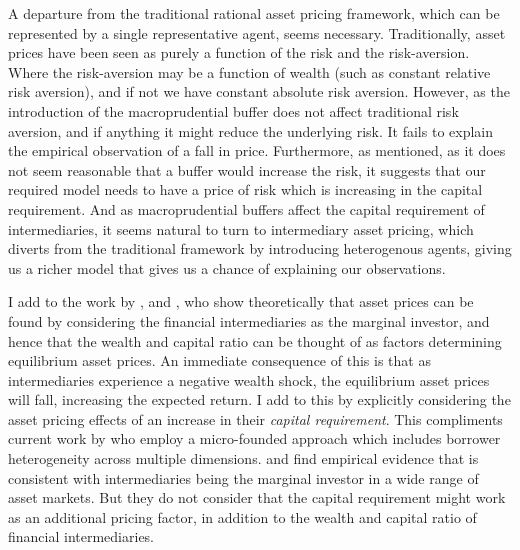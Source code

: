 \documentclass[11pt]{article}
\let\cite=\citet
\begin{document}
A departure from the traditional rational asset pricing framework, which can be represented by a single representative agent, seems necessary. Traditionally, asset prices have been seen as purely a function of the risk and the risk-aversion. Where the risk-aversion may be a function of wealth (such as constant relative risk aversion), and if not we have constant absolute risk aversion. However, as the introduction of the macroprudential buffer does not affect traditional risk aversion, and if anything it might reduce the underlying risk. It fails to explain the empirical observation of a fall in price. Furthermore, as mentioned, as it does not seem reasonable that a buffer would increase the risk, it suggests that our required model needs to have a price of risk which is increasing in the capital requirement. And as macroprudential buffers affect the capital requirement of intermediaries, it seems natural to turn to intermediary asset pricing, which diverts from the traditional framework by introducing heterogenous agents, giving us a richer model that gives us a chance of explaining our observations.
 
I add to the work by \citet{Brunnermeier2009}, \citet{He2013} and \citet{Brunnermeier2014}, who show theoretically that asset prices can be found by considering the financial intermediaries as the marginal investor, and hence that the wealth and capital ratio can be thought of as factors determining equilibrium asset prices. An immediate consequence of this is that as intermediaries experience a negative wealth shock, the equilibrium asset prices will fall, increasing the expected return. I add to this by explicitly considering the asset pricing effects of an increase in their \emph{capital requirement}. This compliments current work by \cite{harris2018aggregate} who employ a micro-founded approach which includes borrower heterogeneity across multiple dimensions. \citet{Adrian2014} and \citet{He2017} find empirical evidence that is consistent with intermediaries being the marginal investor in a wide range of asset markets. But they do not consider that the capital requirement might work as an additional pricing factor, in addition to the wealth and capital ratio of financial intermediaries. 
\end{document}
